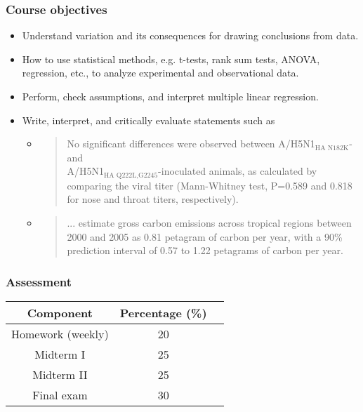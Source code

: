 \documentclass[12pt]{article}
\begin{document}
\subsubsection*{Course objectives}
\begin{itemize}
\item Understand variation and its consequences for drawing conclusions from data.
\item How to use statistical methods, e.g. t-tests, rank sum tests, ANOVA, regression, etc., to analyze experimental and observational data.
\item Perform, check assumptions, and interpret multiple linear regression.
\item Write, interpret, and critically evaluate statements such as
\begin{itemize}
\item
\begin{quote}
No significant differences were observed between A/H5N1$_{\mbox{HA N182K}}$- and \\A/H5N1$_{\mbox{HA Q222L,G2245}}$-inoculated animals, as calculated by comparing the viral titer (Mann-Whitney test, P=0.589 and 0.818 for nose and throat titers, respectively).
\end{quote}
\item
\begin{quote}
... estimate gross carbon emissions across tropical regions between 2000 and 2005 as 0.81 petagram of carbon per year, with a 90\% prediction interval of 0.57 to 1.22 petagrams of carbon per year.
\end{quote}
\end{itemize}
\end{itemize}
\subsubsection*{Assessment}
\begin{center}
\begin{tabular}{ccc}
Component & Percentage (\%) \\
\hline
Homework (weekly) & 20 \\
Midterm I & 25 \\
Midterm II & 25 \\
Final exam & 30 \\
\hline
\end{tabular}
\end{center}
\end{document}
